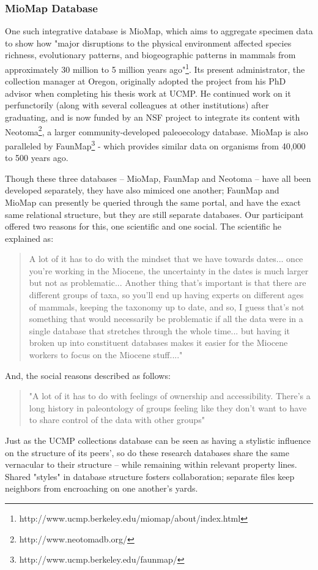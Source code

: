 \subsubsection{MioMap Database}
One such integrative database is MioMap, which aims to aggregate specimen data to show how "major disruptions to the physical environment affected species richness, evolutionary patterns, and biogeographic patterns in mammals from approximately 30 million to 5 million years ago"\footnote{http://www.ucmp.berkeley.edu/miomap/about/index.html}. Its present administrator, the collection manager at Oregon, originally adopted the project from his PhD advisor when completing his thesis work at UCMP. He continued work on it perfunctorily (along with several colleagues at other institutions) after graduating, and is now funded by an NSF project to integrate its content with Neotoma\footnote{http://www.neotomadb.org/}, a larger community-developed paleoecology database. MioMap is also paralleled by FaunMap\footnote{http://www.ucmp.berkeley.edu/faunmap/} - which provides similar data on organisms from 40,000 to 500 years ago.

Though these three databases -- MioMap, FaunMap and Neotoma -- have all been developed separately, they have also mimiced one another;  FaunMap and MioMap can presently be queried through the same portal, and have the exact same relational structure, but they are still separate databases.  Our participant offered two reasons for this, one scientific and one social. The scientific he explained as:
\begin{quote}
A lot of it has to do with the mindset that we have towards dates... once you're working in the Miocene, the uncertainty in the dates is much larger but not as problematic... Another thing that's important is that there are different groups of taxa, so you'll end up having experts on different ages of mammals, keeping the taxonomy up to date, and so, I guess that's not something that would necessarily be problematic if all the data were in a single database that stretches through the whole time... but having it broken up into constituent databases makes it easier for the Miocene workers to focus on the Miocene stuff...."
\end{quote}
And, the social reasons described as follows:
\begin{quote}
"A lot of it has to do with feelings of ownership and accessibility. There's a long history in paleontology of groups feeling like they don't want to have to share control of the data with other groups"
\end{quote}
Just as the UCMP collections database can be seen as having a stylistic influence on the structure of its peers', so do these research databases share the same vernacular to their structure -- while remaining within relevant property lines. Shared "styles" in database structure fosters collaboration; separate files keep neighbors from encroaching on one another's yards.

